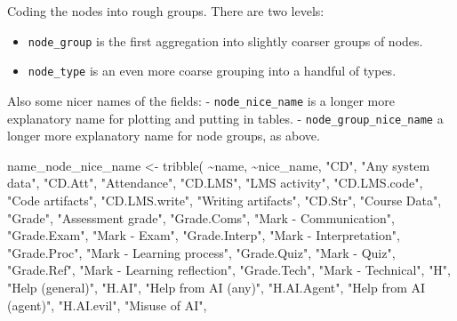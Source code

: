 \documentclass[
  letterpaper,
  DIV=11,
  numbers=noendperiod]{scrartcl}
\newenvironment{Shaded}{\begin{snugshade}}{\end{snugshade}}
\newcommand{\FunctionTok}[1]{\textcolor[rgb]{0.28,0.35,0.67}{#1}}
\newcommand{\NormalTok}[1]{\textcolor[rgb]{0.00,0.23,0.31}{#1}}
\newcommand{\OtherTok}[1]{\textcolor[rgb]{0.00,0.23,0.31}{#1}}
\newcommand{\SpecialCharTok}[1]{\textcolor[rgb]{0.37,0.37,0.37}{#1}}
\newcommand{\StringTok}[1]{\textcolor[rgb]{0.13,0.47,0.30}{#1}}
\providecommand{\tightlist}{%
  \setlength{\itemsep}{0pt}\setlength{\parskip}{0pt}}
\begin{document}
Coding the nodes into rough groups. There are two levels:

\begin{itemize}
\tightlist
\item
  \texttt{node\_group} is the first aggregation into slightly coarser
  groups of nodes.
\item
  \texttt{node\_type} is an even more coarse grouping into a handful of
  types.
\end{itemize}

Also some nicer names of the fields: - \texttt{node\_nice\_name} is a
longer more explanatory name for plotting and putting in tables. -
\texttt{node\_group\_nice\_name} a longer more explanatory name for node
groups, as above.

\begin{Shaded}
\begin{Highlighting}[]
\NormalTok{name\_node\_nice\_name }\OtherTok{\textless{}{-}} \FunctionTok{tribble}\NormalTok{(}
    \SpecialCharTok{\textasciitilde{}}\NormalTok{name, }\SpecialCharTok{\textasciitilde{}}\NormalTok{nice\_name,}
    \StringTok{"CD"}\NormalTok{, }\StringTok{"Any system data"}\NormalTok{,}
    \StringTok{"CD.Att"}\NormalTok{, }\StringTok{"Attendance"}\NormalTok{,}
    \StringTok{"CD.LMS"}\NormalTok{, }\StringTok{"LMS activity"}\NormalTok{,}
    \StringTok{"CD.LMS.code"}\NormalTok{, }\StringTok{"Code artifacts"}\NormalTok{,}
    \StringTok{"CD.LMS.write"}\NormalTok{, }\StringTok{"Writing artifacts"}\NormalTok{, }
    \StringTok{"CD.Str"}\NormalTok{, }\StringTok{"Course Data"}\NormalTok{,}
    \StringTok{"Grade"}\NormalTok{, }\StringTok{"Assessment grade"}\NormalTok{,}
    \StringTok{"Grade.Coms"}\NormalTok{, }\StringTok{"Mark {-} Communication"}\NormalTok{,}
    \StringTok{"Grade.Exam"}\NormalTok{, }\StringTok{"Mark {-} Exam"}\NormalTok{,}
    \StringTok{"Grade.Interp"}\NormalTok{, }\StringTok{"Mark {-} Interpretation"}\NormalTok{,}
    \StringTok{"Grade.Proc"}\NormalTok{, }\StringTok{"Mark {-} Learning process"}\NormalTok{,}
    \StringTok{"Grade.Quiz"}\NormalTok{, }\StringTok{"Mark {-} Quiz"}\NormalTok{,}
    \StringTok{"Grade.Ref"}\NormalTok{, }\StringTok{"Mark {-} Learning reflection"}\NormalTok{,}
    \StringTok{"Grade.Tech"}\NormalTok{, }\StringTok{"Mark {-} Technical"}\NormalTok{,}
    \StringTok{"H"}\NormalTok{, }\StringTok{"Help (general)"}\NormalTok{,}
    \StringTok{"H.AI"}\NormalTok{, }\StringTok{"Help from AI (any)"}\NormalTok{,}
    \StringTok{"H.AI.Agent"}\NormalTok{, }\StringTok{"Help from AI (agent)"}\NormalTok{,}
    \StringTok{"H.AI.evil"}\NormalTok{, }\StringTok{"Misuse of AI"}\NormalTok{,}

\end{Highlighting}
\end{Shaded}
\end{document}
